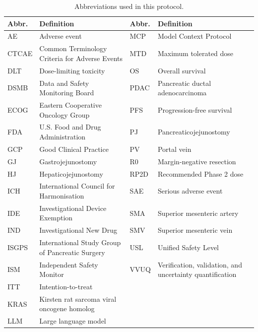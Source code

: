 \begin{table}[htbp]
\centering
\footnotesize
\caption{Abbreviations used in this protocol.}
\label{tab:abbrev}
\begin{tabularx}{\textwidth}{L{1.3cm} L{6.8cm} L{1.3cm} L{6.2cm}}
\toprule
\textbf{Abbr.} & \textbf{Definition} & \textbf{Abbr.} & \textbf{Definition} \\
\midrule
AE    & Adverse event                                  & MCP  & Model Context Protocol \\
CTCAE & Common Terminology Criteria for Adverse Events  & MTD  & Maximum tolerated dose \\
DLT   & Dose-limiting toxicity                          & OS   & Overall survival \\
DSMB  & Data and Safety Monitoring Board                & PDAC & Pancreatic ductal adenocarcinoma \\
ECOG  & Eastern Cooperative Oncology Group              & PFS  & Progression-free survival \\
FDA   & U.S. Food and Drug Administration               & PJ   & Pancreaticojejunostomy \\
GCP   & Good Clinical Practice                          & PV   & Portal vein \\
GJ    & Gastrojejunostomy                               & R0   & Margin-negative resection \\
HJ    & Hepaticojejunostomy                             & RP2D & Recommended Phase 2 dose \\
ICH   & International Council for Harmonisation         & SAE  & Serious adverse event \\
IDE   & Investigational Device Exemption                & SMA  & Superior mesenteric artery \\
IND   & Investigational New Drug                        & SMV  & Superior mesenteric vein \\
ISGPS & International Study Group of Pancreatic Surgery & USL  & Unified Safety Level \\
ISM   & Independent Safety Monitor                      & VVUQ & Verification, validation, and uncertainty quantification \\
ITT   & Intention-to-treat                              &      & \\
KRAS  & Kirsten rat sarcoma viral oncogene homolog      &      & \\
LLM   & Large language model                            &      & \\
\bottomrule
\end{tabularx}
\end{table}


